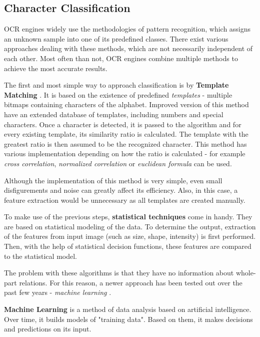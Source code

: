 \subsection{Character Classification}

OCR engines widely use the methodologies of pattern recognition, which assigns an unknown sample into one of its predefined classes. There exist various approaches dealing with these methods, which are not necessarily independent of each other. Most often than not, OCR engines combine multiple methods to achieve the most accurate results.

The first and most simple way to approach classification is by \textbf{Template Matching} \citep{templateMatching}. It is based on the existence of predefined \emph{templates} - multiple bitmaps containing characters of the alphabet. Improved version of this method have an extended database of templates, including numbers and special characters. Once a character is detected, it is passed to the algorithm and for every existing template, its similarity ratio is calculated. The template with the greatest ratio is then assumed to be the recognized character. This method has various implementation depending on how the ratio is calculated - for example \emph{cross correlation}, \emph{normalized correlation} or \emph{euclidean formula} can be used.

Although the implementation of this method is very simple, even small disfigurements and noise can greatly affect its efficiency. Also, in this case, a feature extraction would be unnecessary as all templates are created manually.

To make use of the previous steps, \textbf{statistical techniques} \citep{characterClassification} come in handy. They are based on statistical modeling of the data. To determine the output, extraction of the features from input image (such as size, shape, intensity) is first performed. Then, with the help of statistical decision functions, these features are compared to the statistical model.

The problem with these algorithms is that they have no information about whole-part relations. For this reason, a newer approach has been tested out over the past few years - \emph{machine learning} \citep{characterClassification}.

\textbf{Machine Learning} is a method of data analysis based on artificial intelligence. Over time, it builds models of "training data". Based on them, it makes decisions and predictions on its input. 

